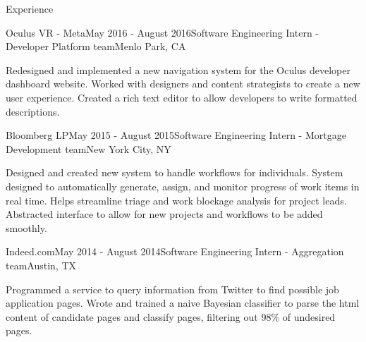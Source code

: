 \documentclass{resume} %
\begin{document}
\begin{rSection}{Experience}

  \begin{rSubsection}{Oculus VR - Meta}{May 2016 - August 2016}{Software Engineering Intern - Developer Platform team}{Menlo Park, CA}
  \item Redesigned and implemented a new navigation system for the Oculus
      developer dashboard website. Worked with designers and content strategists
      to create a new user experience. Created a rich text editor to allow
      developers to write formatted descriptions. 
  \end{rSubsection}



  \begin{rSubsection}{Bloomberg LP}{May 2015 - August 2015}{Software Engineering Intern - Mortgage Development team}{New York City, NY}
  \item Designed and created new system to handle workflows for individuals.
      System designed to automatically generate, assign, and monitor progress of
      work items in real time. Helps streamline triage and work blockage
      analysis for project leads. Abstracted interface to allow for new projects
      and workflows to be added smoothly. 
\end{rSubsection}


\begin{rSubsection}{Indeed.com}{May 2014 - August 2014}{Software Engineering Intern - Aggregation team}{Austin, TX}
\item Programmed a service to query information from Twitter to find possible
    job application pages. Wrote and trained a naive Bayesian classifier to
    parse the html content of candidate pages and classify pages, filtering out
    98\% of undesired pages. 
\end{rSubsection}

\end{rSection}
\end{document}
